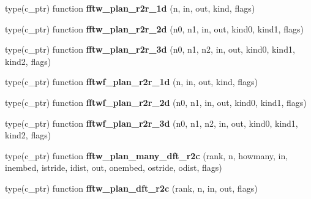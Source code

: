 \begin{DoxyCompactItemize}
\item 
type(c\+\_\+ptr) function {\bfseries fftw\+\_\+plan\+\_\+r2r\+\_\+1d} (n, in, out, kind, flags)\hypertarget{interfacefftw3_1_1fftw__plan__gen_a5ca5d2d1b88ce8d5f9782cae3d71002a}{}\label{interfacefftw3_1_1fftw__plan__gen_a5ca5d2d1b88ce8d5f9782cae3d71002a}

\item 
type(c\+\_\+ptr) function {\bfseries fftw\+\_\+plan\+\_\+r2r\+\_\+2d} (n0, n1, in, out, kind0, kind1, flags)\hypertarget{interfacefftw3_1_1fftw__plan__gen_af0dedc437f83f9c2d9a80bc89a140693}{}\label{interfacefftw3_1_1fftw__plan__gen_af0dedc437f83f9c2d9a80bc89a140693}

\item 
type(c\+\_\+ptr) function {\bfseries fftw\+\_\+plan\+\_\+r2r\+\_\+3d} (n0, n1, n2, in, out, kind0, kind1, kind2, flags)\hypertarget{interfacefftw3_1_1fftw__plan__gen_ad8ab8742ce2ad65b8749add40703698e}{}\label{interfacefftw3_1_1fftw__plan__gen_ad8ab8742ce2ad65b8749add40703698e}

\item 
type(c\+\_\+ptr) function {\bfseries fftwf\+\_\+plan\+\_\+r2r\+\_\+1d} (n, in, out, kind, flags)\hypertarget{interfacefftw3_1_1fftw__plan__gen_a527611f5ae0f06f6ffb292b7dd9ad4a2}{}\label{interfacefftw3_1_1fftw__plan__gen_a527611f5ae0f06f6ffb292b7dd9ad4a2}

\item 
type(c\+\_\+ptr) function {\bfseries fftwf\+\_\+plan\+\_\+r2r\+\_\+2d} (n0, n1, in, out, kind0, kind1, flags)\hypertarget{interfacefftw3_1_1fftw__plan__gen_a376b64ec939328def72482269a1cb826}{}\label{interfacefftw3_1_1fftw__plan__gen_a376b64ec939328def72482269a1cb826}

\item 
type(c\+\_\+ptr) function {\bfseries fftwf\+\_\+plan\+\_\+r2r\+\_\+3d} (n0, n1, n2, in, out, kind0, kind1, kind2, flags)\hypertarget{interfacefftw3_1_1fftw__plan__gen_a381a233739cabaef78ad0545e7cd410f}{}\label{interfacefftw3_1_1fftw__plan__gen_a381a233739cabaef78ad0545e7cd410f}

\item 
type(c\+\_\+ptr) function {\bfseries fftw\+\_\+plan\+\_\+many\+\_\+dft\+\_\+r2c} (rank, n, howmany, in, inembed, istride, idist, out, onembed, ostride, odist, flags)\hypertarget{interfacefftw3_1_1fftw__plan__gen_a6e1e9d75e15166b1368f65a6cf48192f}{}\label{interfacefftw3_1_1fftw__plan__gen_a6e1e9d75e15166b1368f65a6cf48192f}

\item 
type(c\+\_\+ptr) function {\bfseries fftw\+\_\+plan\+\_\+dft\+\_\+r2c} (rank, n, in, out, flags)\hypertarget{interfacefftw3_1_1fftw__plan__gen_a579073ac291b4b469671b069803b4752}{}\label{interfacefftw3_1_1fftw__plan__gen_a579073ac291b4b469671b069803b4752}


\end{DoxyCompactItemize}
